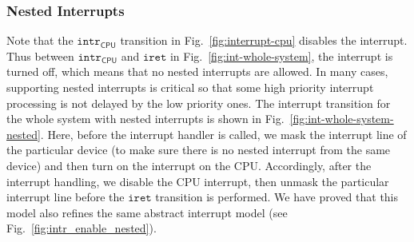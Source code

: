 \subsubsection{Nested Interrupts}

Note that the $\texttt{intr}_{\textsf{CPU}}$ transition in
Fig.~\ref{fig:interrupt-cpu} disables the interrupt. Thus between
$\texttt{intr}_{\textsf{CPU}}$ and $\texttt{iret}$ in
Fig.~\ref{fig:int-whole-system}, the interrupt is turned off, which means that
no nested interrupts are allowed. In many cases, supporting nested interrupts is
critical so that some high priority interrupt processing is not delayed by the
low priority ones.  The interrupt transition for the whole system with nested
interrupts is shown in Fig.~\ref{fig:int-whole-system-nested}.  Here, before the
interrupt handler is called, we mask the interrupt line of the particular device
(to make sure there is no nested interrupt from the same device) and then turn
on the interrupt on the CPU. Accordingly, after the interrupt handling, we
disable the CPU interrupt, then unmask the particular interrupt line before the
$\texttt{iret}$ transition is performed.  We have proved that this model also
refines the same abstract interrupt model (see
Fig.~\ref{fig:intr_enable_nested}).

